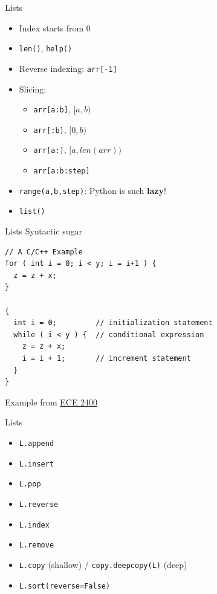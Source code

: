 \documentclass{../TexTemplate/myslide}
\begin{document}
\begin{frame}[fragile]{Lists}
\begin{itemize}
	\item Index starts from 0
	\item \verb'len()', \verb'help()'
	\item Reverse indexing: \verb'arr[-1]'
	\item Slicing:
	\begin{itemize}
		\item \verb'arr[a:b]', $[a,b)$
		\item \verb'arr[:b]', $[0,b)$
		\item \verb'arr[a:]', $[a,len(arr))$
		\item \verb'arr[a:b:step]'
	\end{itemize}
	\item \verb'range(a,b,step)': Python is such \textbf{lazy}!
	\item \verb'list()'
\end{itemize}
\end{frame}

\begin{frame}[fragile]{Lists}
Syntactic sugar
\begin{lstlisting}
// A C/C++ Example
for ( int i = 0; i < y; i = i+1 ) {
  z = z + x;
}

{
  int i = 0;         // initialization statement
  while ( i < y ) {  // conditional expression
    z = z + x;
    i = i + 1;       // increment statement
  }
}
\end{lstlisting}
\scriptsize * Example from \href{https://cornell-ece2400.github.io/ece2400-docs/ece2400-T01-intro-c/#7-syntactic-sugar}{ECE 2400}
\end{frame}

\begin{frame}[fragile]{Lists}
\begin{itemize}
	\item \verb'L.append'
	\item \verb'L.insert'
	\item \verb'L.pop'
	\item \verb'L.reverse'
	\item \verb'L.index'
	\item \verb'L.remove'
	\item \verb'L.copy' (shallow) / \verb'copy.deepcopy(L)' (deep)
	\item \verb'L.sort(reverse=False)'
\end{itemize}
\end{frame}
\end{document}

